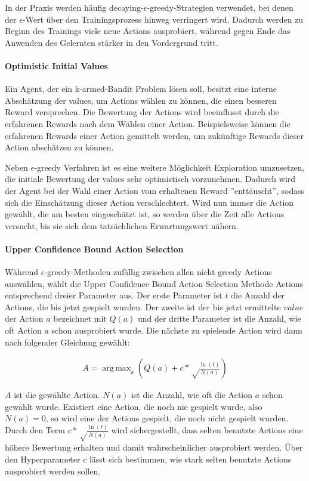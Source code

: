 \documentclass[11pt]{scrartcl}
\DeclareMathOperator*{\argmax}{arg\,max}
\begin{document}
In der Praxis werden häufig decaying-$\epsilon$-greedy-Strategien verwendet, bei denen der
$\epsilon$-Wert über den Trainingsprozess hinweg verringert wird. Dadurch werden zu Beginn
des Trainings viele neue Actions ausprobiert, während gegen Ende das Anwenden des
Gelernten stärker in den Vordergrund tritt.

\paragraph{Optimistic Initial Values}
Ein Agent, der ein k-armed-Bandit Problem lösen soll, besitzt eine interne Abschätzung der
values, um Actions wählen zu können, die einen besseren Reward versprechen. Die
Bewertung der Actions wird beeinflusst durch die erfahrenen Rewards nach dem Wählen einer
Action. Beispielsweise können die erfahrenen Rewards einer Action gemittelt werden, um
zukünftige Rewards dieser Action abschätzen zu können.

Neben $\epsilon$-greedy Verfahren ist es eine weitere Möglichkeit Exploration umzusetzen,
die initiale Bewertung der values sehr optimistisch vorzunehmen. Dadurch wird der Agent
bei der Wahl einer Action vom erhaltenen Reward ''enttäuscht'', sodass sich die
Einschätzung dieser Action verschlechtert. Wird nun immer die Action gewählt, die am
besten eingeschätzt ist, so werden über die Zeit alle Actions versucht, bis sie sich dem
tatsächlichen Erwartungswert nähern.

\paragraph{Upper Confidence Bound Action Selection}
Während $\epsilon$-greedy-Methoden zufällig zwischen allen nicht greedy Actions
auswählen, wählt die Upper Confidence Bound Ac\-tion Selection Methode Actions entsprechend
dreier Parameter aus.
Der erste Parameter ist $t$ die Anzahl der Actions, die bis jetzt gespielt wurden. Der
zweite ist der bis jetzt ermittelte $value$ der Action $a$ bezeichnet mit $Q(a)$ und der
dritte Parameter ist die Anzahl, wie oft Action $a$ schon ausprobiert wurde. Die nächste
zu spielende Action wird dann nach folgender Gleichung gewählt:

\begin{align}
A = \argmax_a\left( Q(a) + c*\sqrt\frac{\ln(t)}{N(a)} \right)
\end{align}

$A$ ist die gewählte Action. $N(a)$ ist die Anzahl, wie oft die Action $a$ schon gewählt
wurde. Existiert eine Action, die noch nie gespielt wurde, also $N(a)=0$, so wird eine der
Actions gespielt, die noch nicht gespielt wurden. Durch den Term
$c*\sqrt\frac{\ln(t)}{N(a)}$ wird sichergestellt, dass selten benutzte Actions eine höhere
Bewertung erhalten und damit wahrscheinlicher ausprobiert werden. Über den Hyperparameter
$c$ lässt sich bestimmen, wie stark selten benutzte Actions ausprobiert werden sollen.
\end{document}
